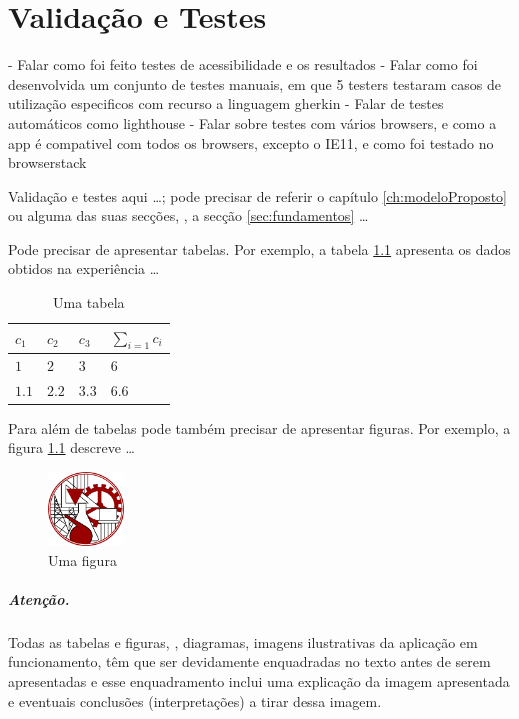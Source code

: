 \chapter{Validação e Testes}
\label{ch:validacaoTestes}

- Falar como foi feito testes de acessibilidade e os resultados
- Falar como foi desenvolvida um conjunto de testes manuais, em que 5 testers testaram casos de utilização especificos com recurso a linguagem gherkin
- Falar de testes automáticos como lighthouse
- Falar sobre testes com vários browsers, e como a app é compativel com todos os browsers, excepto o IE11, e como foi testado no browserstack

Validação e testes aqui \ldots; pode precisar de referir o capítulo \ref{ch:modeloProposto} ou alguma das suas secções, \eg, a secção \ref{sec:fundamentos} \ldots

Pode precisar de apresentar tabelas. Por exemplo, a tabela \ref{tab:umaTabela} apresenta os dados obtidos na experiência \ldots
\begin{table}[h]
   \centering
   \begin{tabular}{l|l|l|l}
      $c_1$ & $c_2$ & $c_3$ & $\sum_{i=1} c_i$
      \\
      \hline \hline
      $1$ & $2$ & $3$ & $6$
      \\ \hline
      $1.1$ & $2.2$ & $3.3$ & $6.6$
      \\
      \hline \hline
   \end{tabular}
\caption{Uma tabela}
\label{tab:umaTabela}
\end{table}

Para além de tabelas pode também precisar de apresentar figuras. Por exemplo, a figura \ref{fig:umafigura} descreve \ldots
\begin{figure}[H][h]
   \centering
   \includegraphics[width=2cm]{./fig_logo_ISEL}
\caption{Uma figura}
\label{fig:umafigura}
\end{figure}
\noindent

\paragraph{Atenção.} Todas as tabelas e figuras, \eg, diagramas, imagens ilustrativas da aplicação em funcionamento, têm que ser devidamente enquadradas no texto antes de serem apresentadas e esse enquadramento inclui uma explicação da imagem apresentada e eventuais conclusões (interpretações) a tirar dessa imagem.


